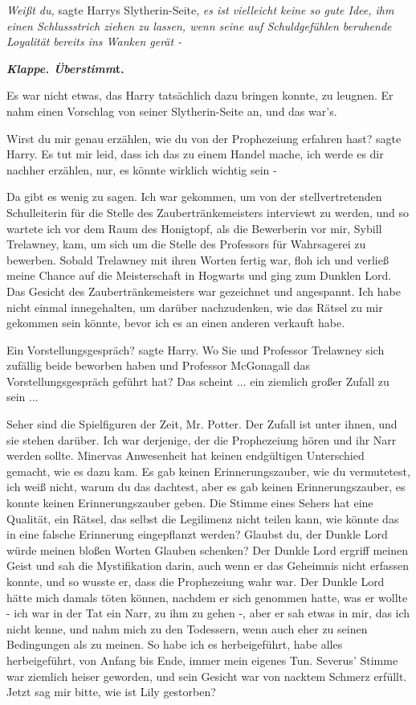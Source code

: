 \emph{Weißt du,} sagte Harrys Slytherin-Seite, \emph{es ist vielleicht keine so
gute Idee, ihm einen Schlussstrich ziehen zu lassen, wenn seine auf
Schuldgefühlen beruhende Loyalität} \emph{bereits ins Wanken gerät -}

\textbf{\emph{Klappe. Überstimm}}\textbf{t.}

Es war nicht etwas, das Harry tatsächlich dazu bringen konnte, zu leugnen. Er
nahm einen Vorschlag von seiner Slytherin-Seite an, und das war's.

\glqq{}Wirst du mir genau erzählen, wie du von der Prophezeiung erfahren
hast?\grqq{} sagte Harry. \glqq{}Es tut mir leid, dass ich das zu einem Handel
mache, ich werde es dir nachher erzählen, nur, es könnte wirklich wichtig sein
-\grqq{}

\glqq{}Da gibt es wenig zu sagen. Ich war gekommen, um von der stellvertretenden
Schulleiterin für die Stelle des Zaubertränkemeisters interviewt zu werden, und
so wartete ich vor dem Raum des Honigtopf, als die Bewerberin vor mir, Sybill
Trelawney, kam, um sich um die Stelle des Professors für Wahrsagerei zu
bewerben. Sobald Trelawney mit ihren Worten fertig war, floh ich und verließ
meine Chance auf die Meisterschaft in Hogwarts und ging zum Dunklen Lord.\grqq{}
Das Gesicht des Zaubertränkemeisters war gezeichnet und angespannt. \glqq{}Ich
habe nicht einmal innegehalten, um darüber nachzudenken, wie das Rätsel zu mir
gekommen sein könnte, bevor ich es an einen anderen verkauft habe.\grqq{}

\glqq{}Ein Vorstellungsgespräch?\grqq{} sagte Harry. \glqq{}Wo Sie und Professor
Trelawney sich zufällig beide beworben haben und Professor McGonagall das
Vorstellungsgespräch geführt hat? Das scheint ... ein ziemlich großer Zufall zu
sein ...\grqq{}

\glqq{}Seher sind die Spielfiguren der Zeit, Mr. Potter. Der Zufall ist unter
ihnen, und sie stehen darüber. Ich war derjenige, der die Prophezeiung hören und
ihr Narr werden sollte. Minervas Anwesenheit hat keinen endgültigen Unterschied
gemacht, wie es dazu kam. Es gab keinen Erinnerungszauber, wie du vermutetest,
ich weiß nicht, warum du das dachtest, aber es gab keinen Erinnerungszauber, es
konnte keinen Erinnerungszauber geben. Die Stimme eines Sehers hat eine
Qualität, ein Rätsel, das selbst die Legilimenz nicht teilen kann, wie könnte
das in eine falsche Erinnerung eingepflanzt werden? Glaubst du, der Dunkle Lord
würde meinen bloßen Worten Glauben schenken? Der Dunkle Lord ergriff meinen
Geist und sah die Mystifikation darin, auch wenn er das Geheimnis nicht erfassen
konnte, und so wusste er, dass die Prophezeiung wahr war. Der Dunkle Lord hätte
mich damals töten können, nachdem er sich genommen hatte, was er wollte - ich
war in der Tat ein Narr, zu ihm zu gehen -, aber er sah etwas in mir, das ich
nicht kenne, und nahm mich zu den Todessern, wenn auch eher zu seinen
Bedingungen als zu meinen. So habe ich es herbeigeführt, habe alles
herbeigeführt, von Anfang bis Ende, immer mein eigenes Tun.\grqq{} Severus'
Stimme war ziemlich heiser geworden, und sein Gesicht war von nacktem Schmerz
erfüllt. \glqq{}Jetzt sag mir bitte, wie ist Lily gestorben?\grqq{}

